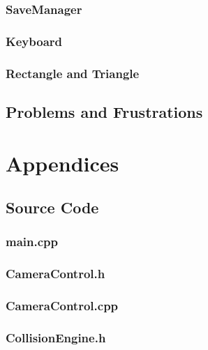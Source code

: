 \documentclass{article}
\begin{document}
\subsubsection{SaveManager}

\subsubsection{Keyboard}

\subsubsection{Rectangle and Triangle}

\subsection{Problems and Frustrations}

\section{Appendices}

\subsection{Source Code}

\subsubsection{main.cpp}
	
 				
\subsubsection{CameraControl.h}
	

\subsubsection{CameraControl.cpp}
	
					
\subsubsection{CollisionEngine.h}
	
					
\end{document}
